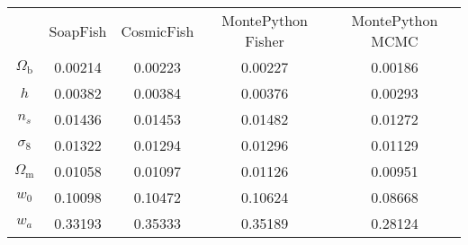 \begin{table}
\centering
\begin{tabular}{|c|c|c|c|c|}
 & SoapFish & CosmicFish & MontePython Fisher & MontePython MCMC \\
$\Omega_\mathrm{b}$ & 0.00214 & 0.00223 & 0.00227 & 0.00186 \\
$h$ & 0.00382 & 0.00384 & 0.00376 & 0.00293 \\
$n_s$ & 0.01436 & 0.01453 & 0.01482 & 0.01272 \\
$\sigma_8$ & 0.01322 & 0.01294 & 0.01296 & 0.01129 \\
$\Omega_\mathrm{m}$ & 0.01058 & 0.01097 & 0.01126 & 0.00951 \\
$w_0$ & 0.10098 & 0.10472 & 0.10624 & 0.08668 \\
$w_a$ & 0.33193 & 0.35333 & 0.35189 & 0.28124 \\
\end{tabular}
\end{table}
